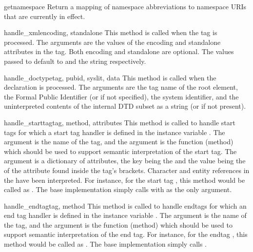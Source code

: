 \begin{methoddesc}{getnamespace}{}
Return a mapping of namespace abbreviations to namespace URIs that are
currently in effect.
\end{methoddesc}

\begin{methoddesc}{handle_xml}{encoding, standalone}
This method is called when the  tag is processed.
The arguments are the values of the encoding and standalone attributes 
in the tag.  Both encoding and standalone are optional.  The values
passed to  default to  and the string
 respectively.
\end{methoddesc}

\begin{methoddesc}{handle_doctype}{tag, pubid, syslit, data}
This method is called when the
 declaration is processed.  The arguments are the
tag name of the root element, the Formal Public Identifier (or  if not specified), the system
identifier, and the uninterpreted contents of the internal DTD subset
as a string (or  if not present).
\end{methoddesc}

\begin{methoddesc}{handle_starttag}{tag, method, attributes}
This method is called to handle start tags for which a start tag
handler is defined in the instance variable .  The
 argument is the name of the tag, and the
 argument is the function (method) which should be used to
support semantic interpretation of the start tag.  The
 argument is a dictionary of attributes, the key being
the  and the value being the  of the attribute
found inside the tag's \code{<>} brackets.  Character and entity
references in the  have been interpreted.  For instance,
for the start tag , this method
would be called as .  The base implementation simply
calls  with  as the only argument.
\end{methoddesc}

\begin{methoddesc}{handle_endtag}{tag, method}
This method is called to handle endtags for which an end tag handler
is defined in the instance variable .  The 
argument is the name of the tag, and the  argument is the
function (method) which should be used to support semantic
interpretation of the end tag.  For instance, for the endtag
, this method would be called as .  The base implementation simply calls
.
\end{methoddesc}

